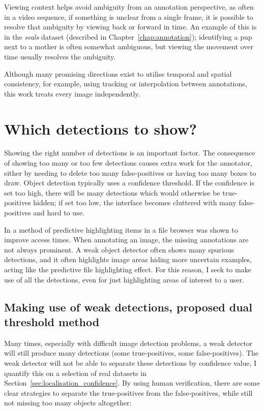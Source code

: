 Viewing context helps avoid ambiguity from an annotation perspective, as often in a video sequence, if something is unclear from a single frame, it is possible to resolve that ambiguity by viewing back or forward in time. An example of this is in the \emph{seals} dataset (described in Chapter~\ref{chap:annotation}); identifying a pup next to a mother is often somewhat ambiguous, but viewing the movement over time usually resolves the ambiguity.

Although many promising directions exist to utilise temporal and spatial consistency, for example, using tracking or interpolation between annotations, this work treats every image independently. 


\section {Which detections to show?}
\label{sec:thresholding}

Showing the right number of detections is an important factor. The consequence of showing too many or too few detections causes extra work for the annotator, either by needing to delete too many false-positives or having too many boxes to draw. Object detection typically uses a confidence threshold. If the confidence is set too high, there will be many detections which would otherwise be true-positives hidden; if set too low, the interface becomes cluttered with many false-positives and hard to use.

In \cite{Fitchett2013} a method of predictive highlighting items in a file browser was shown to improve access times. When annotating an image, the missing annotations are not always prominent. A weak object detector often shows many spurious detections, and it often highlights image areas hiding more uncertain examples, acting like the predictive file highlighting effect. For this reason, I seek to make use of all the detections, even for just highlighting areas of interest to a user. 

\subsection{Making use of weak detections, proposed dual threshold method}

 Many times, especially with difficult image detection problems, a weak detector will still produce many detections (some true-positives, some false-positives). The weak detector will not be able to separate these detections by confidence value, I quantify this on a selection of real datasets in Section~\ref{sec:localisation_confidence}. By using human verification, there are some clear strategies to separate the true-positives from the false-positives, while still not missing too many objects altogether: 

